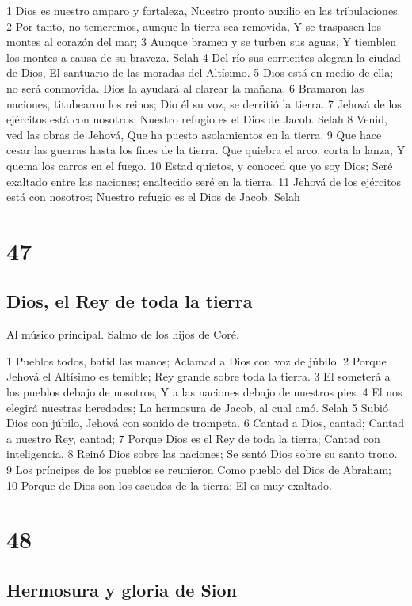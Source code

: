 1 Dios es nuestro amparo y fortaleza,
Nuestro pronto auxilio en las tribulaciones.
2 Por tanto, no temeremos, aunque la tierra sea removida,
Y se traspasen los montes al corazón del mar;
3 Aunque bramen y se turben sus aguas,
Y tiemblen los montes a causa de su braveza. Selah
4 Del río sus corrientes alegran la ciudad de Dios,
El santuario de las moradas del Altísimo.
5 Dios está en medio de ella; no será conmovida.
Dios la ayudará al clarear la mañana.
6 Bramaron las naciones, titubearon los reinos;
Dio él su voz, se derritió la tierra.
7 Jehová de los ejércitos está con nosotros;
Nuestro refugio es el Dios de Jacob. Selah
8 Venid, ved las obras de Jehová,
Que ha puesto asolamientos en la tierra.
9 Que hace cesar las guerras hasta los fines de la tierra.
Que quiebra el arco, corta la lanza,
Y quema los carros en el fuego.
10 Estad quietos, y conoced que yo soy Dios;
Seré exaltado entre las naciones; enaltecido seré en la tierra.
11 Jehová de los ejércitos está con nosotros;
Nuestro refugio es el Dios de Jacob. Selah

\chapter{47}

\section*{Dios, el Rey de toda la tierra}

Al músico principal. Salmo de los hijos de Coré.

1 Pueblos todos, batid las manos;
Aclamad a Dios con voz de júbilo.
2 Porque Jehová el Altísimo es temible;
Rey grande sobre toda la tierra.
3 El someterá a los pueblos debajo de nosotros,
Y a las naciones debajo de nuestros pies.
4 El nos elegirá nuestras heredades;
La hermosura de Jacob, al cual amó. Selah
5 Subió Dios con júbilo,
Jehová con sonido de trompeta.
6 Cantad a Dios, cantad;
Cantad a nuestro Rey, cantad;
7 Porque Dios es el Rey de toda la tierra;
Cantad con inteligencia.
8 Reinó Dios sobre las naciones;
Se sentó Dios sobre su santo trono.
9 Los príncipes de los pueblos se reunieron
Como pueblo del Dios de Abraham;
10 Porque de Dios son los escudos de la tierra;
El es muy exaltado.

\chapter{48}

\section*{Hermosura y gloria de Sion}

